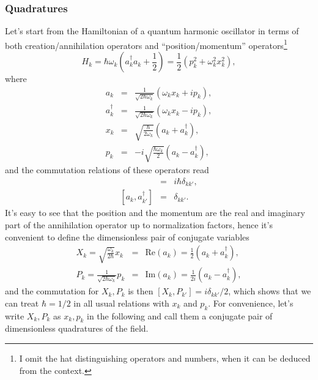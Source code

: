 \documentclass[%
 reprint,
groupedaddress,
showpacs,
 amsmath,amssymb,
 aps,
prb,
]{revtex4-1}
\begin{document}
	\subsubsection{Quadratures} %
	\label{ssub:quadratures}
	

		Let's start from the Hamiltonian of a quantum harmonic oscillator in terms of both creation/annihilation operators and ``position/momentum'' operators\footnote{I omit the hat distinguishing operators and numbers, when it can be deduced from the context.}
		\begin{equation}
			\label{eqns:ham_harmo_osci}
			H_k = \hbar \omega_k ( a^\dagger_k a_k +\frac{1}{2} )= \frac{1}{2} ( p_k^2 +\omega_k^2 x_k^2 ),
		\end{equation}
		where
		\begin{eqnarray}
			a_k &=& \frac{1}{\sqrt{2\hbar \omega_k}}(\omega_k x_k +ip_k),\\
			a_k^\dagger &=& \frac{1}{\sqrt{2\hbar \omega_k}}(\omega_k x_k -ip_k),\\
			x_k &=& \sqrt{\frac{\hbar}{2 \omega_k}} (a_k + a_k^\dagger),\\
			p_k &=& -i \sqrt{\frac{\hbar \omega_k}{2}}(a_k - a_k^\dagger),
		\end{eqnarray}
		and the commutation relations of these operators read
		\begin{eqnarray}
			[x_k,p_{k'}] &=& i \hbar \delta_{kk'},\\
			{}[a_k,a^{\dagger}_{k'}]&=& \delta_{kk'}.
		\end{eqnarray}
		It's easy to see that the position and the momentum are the real and imaginary part of the annihilation operator up to normalization factors, hence it's convenient to define the dimensionless pair of conjugate variables
		\begin{eqnarray}
			X_k = \sqrt{\frac{\omega_k}{2\hbar}}x_k &=& \mathrm{Re} (a_k) = \frac{1}{2} (a_k + a_k^\dagger),\\
			P_k = \frac{1}{\sqrt{2\hbar \omega_k}}p_k &=& \mathrm{Im} (a_k) = \frac{1}{2i} (a_k - a_k^\dagger),
		\end{eqnarray}
		and the commutation for $X_k,P_k$ is then $ [X_k, P_{k'}] = i \delta_{kk'}/2 $, which shows that we can treat $\hbar = 1/2$ in all usual relations with $x_k$ and $p_k$. For convenience, let's write $X_k, P_k$ as $x_k, p_k$ in the following and call them a conjugate pair of dimensionless quadratures of the field.
\end{document}
